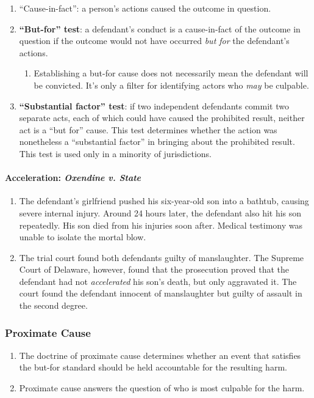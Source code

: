 \begin{enumerate}
    \item ``Cause-in-fact'': a person's actions caused the outcome in question.
    \item \textbf{``But-for'' test}: a defendant's conduct is a cause-in-fact of the outcome in question if the outcome would not have occurred \emph{but for} the defendant's actions.
    \begin{enumerate}
        \item Establishing a but-for cause does not necessarily mean the defendant will be convicted. It's only a filter for identifying actors who \emph{may} be culpable.
    \end{enumerate}
    \item \textbf{``Substantial factor'' test}: if two independent defendants commit two separate acts, each of which could have caused the prohibited result, neither act is a ``but for'' cause. This test determines whether the action was nonetheless a ``substantial factor'' in bringing about the prohibited result. This test is used only in a minority of jurisdictions.
\end{enumerate}

\paragraph{Acceleration: \emph{Oxendine v. State}}

\begin{enumerate}
    \item The defendant's girlfriend pushed his six-year-old son into a bathtub, causing severe internal injury. Around 24 hours later, the defendant also hit his son repeatedly. His son died from his injuries soon after. Medical testimony was unable to isolate the mortal blow.
    \item The trial court found both defendants guilty of manslaughter. The Supreme Court of Delaware, however, found that the prosecution proved that the defendant had not \emph{accelerated} his son's death, but only aggravated it. The court found the defendant innocent of manslaughter but guilty of assault in the second degree.
\end{enumerate}

\subsubsection{Proximate Cause} 

\begin{enumerate}
    \item The doctrine of proximate cause determines whether an event that satisfies the but-for standard should be held accountable for the resulting harm.
    \item Proximate cause answers the question of who is most culpable for the harm.
\end{enumerate}

